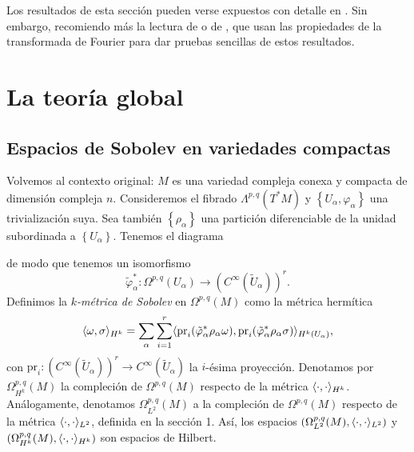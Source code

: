 \documentclass[12pt,a4paper]{article}
\theoremstyle{definition} \newtheorem{defn}[thm]{Definición}
\theoremstyle{definition} \newtheorem{ejemplo}[thm]{Ejemplo}
\theoremstyle{definition} \newtheorem{ejercicio}[thm]{Ejercicio}
\theoremstyle{remark} \newtheorem*{obs}{Observación}
\DeclarePairedDelimiter\esc{\langle}{\rangle}
\newcommand{\CC}{\mathbb{C}}
\newcommand{\pr}{\mathrm{pr}}
\begin{document}
  Los resultados de esta sección pueden verse expuestos con detalle en \cite{evans}. Sin embargo, recomiendo más la lectura de \cite[Capítulo 4]{wells} o de \cite{reiterschuster}, que usan las propiedades de la transformada de Fourier para dar pruebas sencillas de estos resultados.

  \section{La teoría global}
  \subsection{Espacios de Sobolev en variedades compactas}
  Volvemos al contexto original: $M$ es una variedad compleja conexa y compacta de dimensión compleja $n$. Consideremos el fibrado $\Lambda^{p,q}(T^*M)$ y $\left\{ U_\alpha, \varphi_\alpha \right\}$ una trivialización suya. Sea también $\left\{ \rho_\alpha \right\}$ una partición diferenciable de la unidad subordinada a $\left\{ U_\alpha \right\}$. Tenemos el diagrama
  \begin{center}
   \end{center}
   de modo que tenemos un isomorfismo
   \begin{equation*}
     \tilde{\varphi}_\alpha^*:\Omega^{p,q}(U_\alpha) \rightarrow (C^\infty(\tilde{U}_{\alpha}))^r.
   \end{equation*}
   Definimos la \emph{$k$-métrica de Sobolev} en $\Omega^{p,q}(M)$ como la métrica hermítica
   \begin{equation*}
     \esc{\omega,\sigma}_{H^k}=\sum_\alpha \sum_{i=1}^r \esc{\pr_i (\tilde{\varphi}_\alpha^* \rho_\alpha \omega),\pr_i(\tilde{\varphi}_\alpha^* \rho_\alpha \sigma)}_{H^k(U_\alpha)},
   \end{equation*}
   con $\pr_i: (C^\infty(\tilde{U}_\alpha))^r \rightarrow C^\infty(\tilde{U}_\alpha)$ la $i$-ésima proyección. 
   Denotamos por $\Omega^{p,q}_{H^k}(M)$ la compleción de $\Omega^{p,q}(M)$ respecto de la métrica $\esc{\cdot,\cdot}_{H^k}$. Análogamente, denotamos $\Omega^{p,q}_{L^2}(M)$ a la compleción de $\Omega^{p,q}(M)$ respecto de la métrica $\esc{\cdot,\cdot}_{L^2}$, definida en la sección 1. Así, los espacios $(\Omega^{p,q}_{L^2}(M),\esc{\cdot,\cdot}_{L^2})$ y $(\Omega^{p,q}_{H^k}(M),\esc{\cdot,\cdot}_{H^k})$ son espacios de Hilbert.
   
\end{document}

